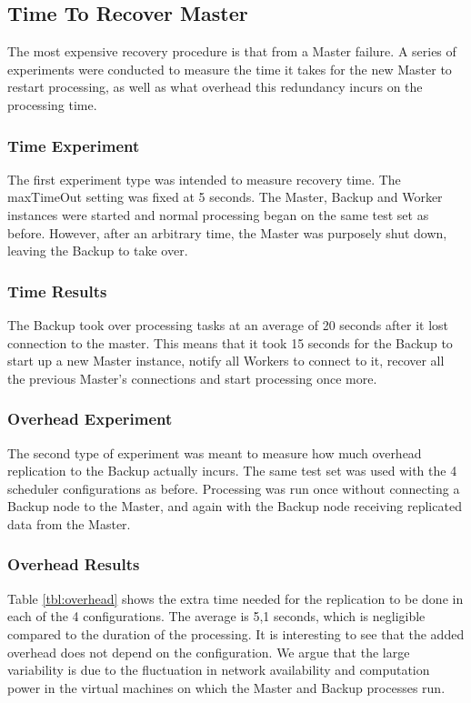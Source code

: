 \documentclass{acm_proc_article-sp}
\begin{document}
\subsection{Time To Recover Master}
The most expensive recovery procedure is that from a Master failure. 
A series of experiments were conducted to measure the time it takes for the new Master to restart processing, as well as what overhead this redundancy incurs on the processing time.

\subsubsection{Time Experiment}
The first experiment type was intended to measure recovery time. 
The maxTimeOut setting was fixed at 5 seconds. 
The Master, Backup and Worker instances were started and normal processing began on the same test set as before. 
However, after an arbitrary time, the Master was purposely shut down, leaving the Backup to take over. 

\subsubsection{Time Results}
The Backup took over processing tasks at an average of 20 seconds after it lost connection to the master.
This means that it took 15 seconds for the Backup to start up a new Master instance, notify all Workers to connect to it, recover all the previous Master's connections and start processing once more.

\subsubsection{Overhead Experiment}
The second type of experiment was meant to measure how much overhead replication to the Backup actually incurs. 
The same test set was used with the 4 scheduler configurations as before. 
Processing was run once without connecting a Backup node to the Master, and again with the Backup node receiving replicated data from the Master.

\subsubsection{Overhead Results}
Table \ref{tbl:overhead} shows the extra time needed for the replication to be done in each of the 4 configurations. 
The average is 5,1 seconds, which is negligible compared to the duration of the processing. 
It is interesting to see that the added overhead does not depend on the configuration. 
We argue that the large variability is due to the fluctuation in network availability and computation power in the virtual machines on which the Master and Backup processes run.
\end{document}
